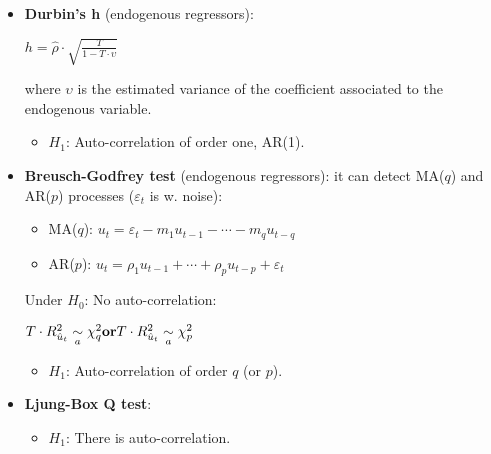 \documentclass[10pt, a4paper, landscape]{extarticle}
\begin{document}
\begin{multicols}{3}
\begin{itemize}[leftmargin=*]
\begin{itemize}[leftmargin=*]
\begin{center}
		\end{center}
		\item \textbf{Durbin's h} (endogenous regressors):
		\begin{center}
			$h = \hat{\rho} \cdot \sqrt{\frac{T}{1 - T \cdot \upsilon}}$
		\end{center}
		where $\upsilon$ is the estimated variance of the coefficient associated to the endogenous variable.
		\begin{itemize}[leftmargin=*]
			\item $H_1$: Auto-correlation of order one, AR(1).
		\end{itemize}
		\item \textbf{Breusch-Godfrey test} (endogenous regressors): it can detect MA($q$) and AR($p$) processes ($\varepsilon_t$ is w. noise):
		\begin{itemize}[leftmargin=*]
			\item MA($q$): $u_t = \varepsilon_t - m_1 u_{t - 1} - \cdots - m_q u_{t - q}$
			\item AR($p$): $u_t = \rho_1 u_{t - 1} + \cdots + \rho_p u_{t - p} + \varepsilon_t$
		\end{itemize}
		Under $H_0$: No auto-correlation:
		\begin{center}
			$\hfill T \cdot R^2_{\hat{u}_t} \underset{a}{\sim} \chi^2_q \hfill \textbf{or} \hfill T \cdot R^2_{\hat{u}_t} \underset{a}{\sim} \chi^2_p \hfill$
		\end{center}
		\begin{itemize}[leftmargin=*]
			\item $H_1$: Auto-correlation of order $q$ (or $p$).
		\end{itemize}
		\item \textbf{Ljung-Box Q test}:
		\begin{itemize}[leftmargin=*]
			\item $H_1$: There is auto-correlation.
		\end{itemize}
	\end{itemize}

\end{itemize}


\end{multicols}
\end{document}
